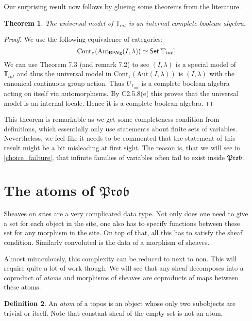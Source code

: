 \documentclass[a4paper]{amsproc}
\theoremstyle{plain}
\newtheorem{theorem}{Theorem}[section]
\theoremstyle{definition}
\newtheorem{definition}[theorem]{Definition}
\theoremstyle{remark}
\numberwithin{equation}{section}
\newcommand{\Set}{\textup{\textsf{Set}}}
\newcommand{\BPAlg}{\textup{\textsf{BPAlg}}}
\newcommand{\Prob}{\mathfrak{Prob}}
\begin{document}
Our surprising result now follows by glueing some theorems from the literature.

\begin{theorem} The universal model of $\mathbb{T}_{int}$ is an internal complete boolean algebra.
\end{theorem}
\begin{proof}
We use the following equivalence of categories:
\[ \text{Cont}_\tau(\text{Aut}_{\BPAlg}(I,\lambda))\simeq \text{\Set}[\mathbb{T}_{int}]  \]
We can use Theorem 7.3 (and remark 7.2) \cite{caramello_lafforgue} %
 to see $(I,\lambda)$ is a special model of $\mathbb{T}_{int}$ and thus the universal model in $\text{Cont}_\tau(\text{Aut}(I,\lambda))$ is $(I,\lambda)$ with the canonical continuous group action.\newline
\indent Thus $U_{\mathbb{T}_{int}}$ is a complete boolean algebra acting on itself via automorphisms.  By C2.5.8(e) \cite{elephant} this proves that the universal model is an internal locale. Hence it is a complete boolean algebra.
\end{proof}

This theorem is remarkable as we get some completeness condition from definitions, which essentially only use statements about finite sets of variables. Nevertheless, we feel like it needs to be commented that the statement of this result might be a bit misleading at first sight. The reason is, that we will see in \ref{choice_failture}, that infinite families of variables often fail to exist inside $\Prob$.


\section{The atoms of $\Prob$ }\label{atoms}

Sheaves on sites are a very complicated data type. Not only does one need to give a set for each object in the site, one also has to specify functions between these set for any morphism in the site. On top of that, all this has to satisfy the sheaf condition. Similarly convoluted is the data of a morphism of sheaves.

Almost miraculously, this complexity can be reduced to next to non. This will require quite a lot of work though. We will see that any sheaf decomposes into a coproduct of \emph{atoms} and morphisms of sheaves are coproducts of maps between these atoms.

\begin{definition} An \emph{atom} of a topos is an object whose only two subobjects are trivial or itself. Note that constant sheaf of the empty set is not an atom.
\end{definition}
\end{document}
